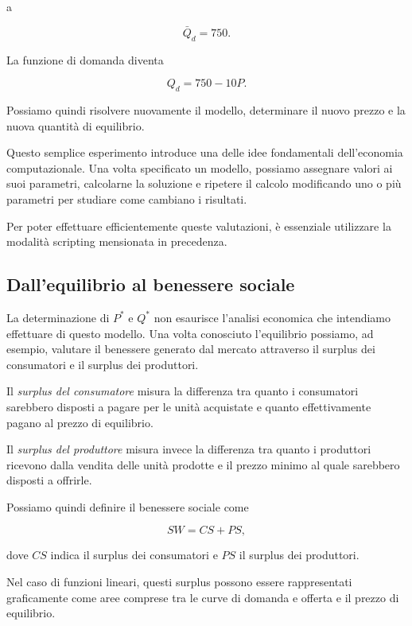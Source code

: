 a

\begin{equation*}
    \bar{Q}_d = 750.
\end{equation*}

La funzione di domanda diventa

\begin{equation*}
    Q_d = 750 - 10P.
\end{equation*}

Possiamo quindi risolvere nuovamente il modello, determinare il
nuovo prezzo e la nuova quantità di equilibrio.

Questo semplice esperimento introduce una delle idee fondamentali
dell'economia computazionale. Una volta specificato un modello,
possiamo assegnare valori ai suoi parametri, calcolarne la soluzione
e ripetere il calcolo modificando uno o più parametri per studiare
come cambiano i risultati.

Per poter effettuare efficientemente queste valutazioni, è essenziale utilizzare la modalità scripting mensionata in precedenza.

\subsection{Dall'equilibrio al benessere sociale}

La determinazione di $P^*$ e $Q^*$ non esaurisce 
l'analisi economica che intendiamo effettuare di questo modello. 
Una volta conosciuto l'equilibrio possiamo,
ad esempio, valutare il benessere generato dal mercato attraverso
il surplus dei consumatori e il surplus dei produttori.

Il \emph{surplus del consumatore} misura la differenza tra quanto
i consumatori sarebbero disposti a pagare per le unità acquistate
e quanto effettivamente pagano al prezzo di equilibrio.

Il \emph{surplus del produttore} misura invece la differenza tra
quanto i produttori ricevono dalla vendita delle unità prodotte
e il prezzo minimo al quale sarebbero disposti a offrirle.

Possiamo quindi definire il benessere sociale come

\begin{equation*}
    SW = CS + PS,
    \label{eq:social_welfare}
\end{equation*}

dove $CS$ indica il surplus dei consumatori e $PS$ il surplus
dei produttori.

Nel caso di funzioni lineari, questi surplus possono essere
rappresentati graficamente come aree comprese tra le curve di
domanda e offerta e il prezzo di equilibrio.

